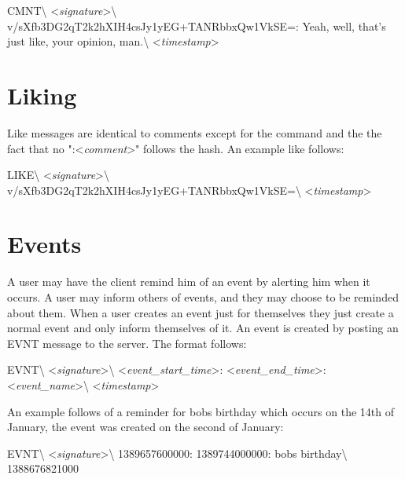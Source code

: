 \begin{center}
CMNT\textbackslash
\textless \textit{signature}\textgreater\textbackslash
v/sXfb3DG2qT2k2hXIH4csJy1yEG+TANRbbxQw1VkSE=:
Yeah, well, that's just like, your opinion, man.\textbackslash
\textless \textit{timestamp}\textgreater
\end{center}

\section{Liking}
Like messages are identical to comments except for the command and the the fact
that no ":\textless \textit{comment}\textgreater" follows the hash. An example
like follows:

\begin{center}
LIKE\textbackslash
\textless \textit{signature}\textgreater\textbackslash
v/sXfb3DG2qT2k2hXIH4csJy1yEG+TANRbbxQw1VkSE=\textbackslash
\textless \textit{timestamp}\textgreater
\end{center}

\section{Events}
A user may have the client remind him of an event by alerting him when it
occurs. A user may inform others of events, and they may choose to be reminded
about them. When a user creates an event just for themselves they just create a
normal event and only inform themselves of it. An event is created by posting an
EVNT message to the server. The format follows:

\begin{center}
EVNT\textbackslash
\textless \textit{signature}\textgreater\textbackslash
\textless \textit{event\_start\_time}\textgreater:
\textless \textit{event\_end\_time}\textgreater:
\textless \textit{event\_name}\textgreater\textbackslash
\textless \textit{timestamp}\textgreater
\end{center}

An example follows of a reminder for bobs birthday which occurs on the 14th of
January, the event was created on the second of January:

\begin{center}
EVNT\textbackslash
\textless \textit{signature}\textgreater\textbackslash
1389657600000:
1389744000000:
bobs birthday\textbackslash
1388676821000
\end{center}
